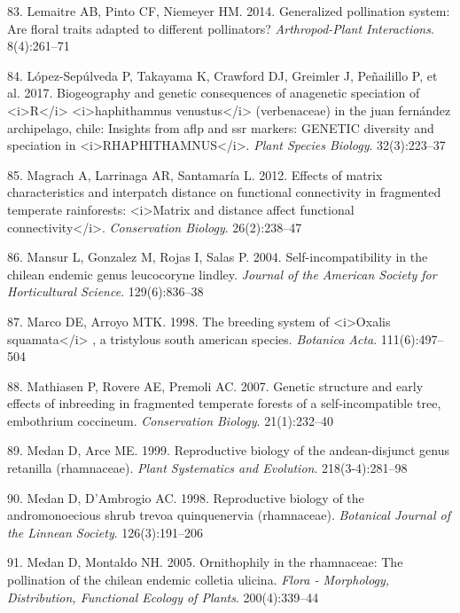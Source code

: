 \documentclass[
]{article}
\begin{document}
\leavevmode\hypertarget{ref-RN131}{}%
83. Lemaitre AB, Pinto CF, Niemeyer HM. 2014. Generalized pollination
system: Are floral traits adapted to different pollinators?
\emph{Arthropod-Plant Interactions}. 8(4):261--71

\leavevmode\hypertarget{ref-RN45}{}%
84. López-Sepúlveda P, Takayama K, Crawford DJ, Greimler J, Peñailillo
P, et al. 2017. Biogeography and genetic consequences of anagenetic
speciation of \textless i\textgreater R\textless/i\textgreater{}
\textless i\textgreater haphithamnus venustus\textless/i\textgreater{}
(verbenaceae) in the juan fernández archipelago, chile: Insights from
aflp and ssr markers: GENETIC diversity and speciation in
\textless i\textgreater RHAPHITHAMNUS\textless/i\textgreater.
\emph{Plant Species Biology}. 32(3):223--37

\leavevmode\hypertarget{ref-RN46}{}%
85. Magrach A, Larrinaga AR, Santamaría L. 2012. Effects of matrix
characteristics and interpatch distance on functional connectivity in
fragmented temperate rainforests: \textless i\textgreater Matrix and
distance affect functional connectivity\textless/i\textgreater.
\emph{Conservation Biology}. 26(2):238--47

\leavevmode\hypertarget{ref-RN47}{}%
86. Mansur L, Gonzalez M, Rojas I, Salas P. 2004. Self-incompatibility
in the chilean endemic genus leucocoryne lindley. \emph{Journal of the
American Society for Horticultural Science}. 129(6):836--38

\leavevmode\hypertarget{ref-RN132}{}%
87. Marco DE, Arroyo MTK. 1998. The breeding system of
\textless i\textgreater Oxalis squamata\textless/i\textgreater{} , a
tristylous south american species. \emph{Botanica Acta}. 111(6):497--504

\leavevmode\hypertarget{ref-RN48}{}%
88. Mathiasen P, Rovere AE, Premoli AC. 2007. Genetic structure and
early effects of inbreeding in fragmented temperate forests of a
self-incompatible tree, embothrium coccineum. \emph{Conservation
Biology}. 21(1):232--40

\leavevmode\hypertarget{ref-RN49}{}%
89. Medan D, Arce ME. 1999. Reproductive biology of the andean-disjunct
genus retanilla (rhamnaceae). \emph{Plant Systematics and Evolution}.
218(3-4):281--98

\leavevmode\hypertarget{ref-RN50}{}%
90. Medan D, D'Ambrogio AC. 1998. Reproductive biology of the
andromonoecious shrub trevoa quinquenervia (rhamnaceae). \emph{Botanical
Journal of the Linnean Society}. 126(3):191--206

\leavevmode\hypertarget{ref-RN133}{}%
91. Medan D, Montaldo NH. 2005. Ornithophily in the rhamnaceae: The
pollination of the chilean endemic colletia ulicina. \emph{Flora -
Morphology, Distribution, Functional Ecology of Plants}. 200(4):339--44
\end{document}
